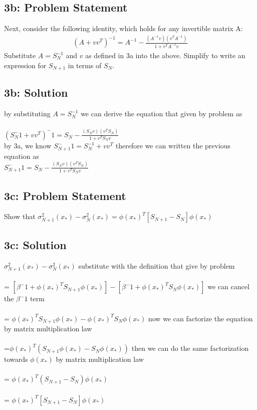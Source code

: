 \documentclass[10pt]{article}
\newcommand{\officialdirections}[1]{{\color{purple} #1}}
\begin{document}
 
\officialdirections{
\subsection*{3b: Problem Statement}
Next, consider the following identity, which holds for any invertible matrix A:
\begin{align}
(A + vv^T)^{-1} = A^{-1} - \frac{ (A^{-1}v)(v^T A^{-1})}{ 1 + v^T A^{-1} v}
\end{align}
Substitute $A = S_N^{-1}$ and $v$ as defined in 3a into the above. Simplify to write an expression for $S_{N+1}$ in terms of $S_{N}$.
}

\subsection{3b: Solution}
by substituting $A = S_N^{-1}$  we can derive the equation that given by problem as 
\\
\\
$(S_{N}^-1 + vv^T)^-1 = S_N - \frac{(S_Nv)(v^TS_N)}{1+v^TS_Nv}$ 
\\
by 3a, we know $S_{N+1}^-1 = S_N^{-1} + vv^T$ therefore we can written the previous equation as 
\\
$S_{N+1}^-1 = S_N - \frac{(S_Nv)(v^TS_N)}{1+v^TS_Nv}$

\officialdirections{
\subsection*{3c: Problem Statement}
Show that $\sigma^2_{N+1}(x_*) - \sigma^2_{N}(x_*) = \phi(x_*)^T \left[ S_{N+1} - S_{N} \right] \phi(x_*)$ 
}


\subsection{3c: Solution}
$\sigma^2_{N+1}(x_*) - \sigma^2_{N}(x_*)$ substitute with the definition that give by problem
\\
\\
= $[\beta^-1+\phi(x_*)^TS_{N+1}\phi(x_*)] - [\beta^-1+\phi(x_*)^TS_{N}\phi(x_*)]$ we can cancel the $\beta^-1$ term 
\\
\\
= $\phi(x_*)^TS_{N+1}\phi(x_*) - \phi(x_*)^TS_{N}\phi(x_*)$ now we can factorize the equation by matrix multiplication law
\\
\\
=$\phi(x_*)^T(S_{N+1}\phi(x_*)-S_N\phi(x_*))$ then we can do the same factorization towards $\phi(x_*)$ by matrix multiplication law
\\
\\
= $\phi(x_*)^T(S_{N+1} - S_N)\phi(x_*)$
\\
\\
= $\phi(x_*)^T \left[ S_{N+1} - S_{N} \right] \phi(x_*)$
\end{document}
